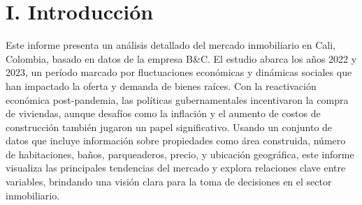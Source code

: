 \documentclass[conference,final,]{IEEEtran}
\begin{document}




\maketitle

\begin{abstract}

\end{abstract}





\maketitle


%
\IEEEpeerreviewmaketitle


\section{I. Introducción}

Este informe presenta un análisis detallado del mercado inmobiliario en
Cali, Colombia, basado en datos de la empresa B\&C. El estudio abarca
los años 2022 y 2023, un período marcado por fluctuaciones económicas y
dinámicas sociales que han impactado la oferta y demanda de bienes
raíces. Con la reactivación económica post-pandemia, las políticas
gubernamentales incentivaron la compra de viviendas, aunque desafíos
como la inflación y el aumento de costos de construcción también jugaron
un papel significativo. Usando un conjunto de datos que incluye
información sobre propiedades como área construida, número de
habitaciones, baños, parqueaderos, precio, y ubicación geográfica, este
informe visualiza las principales tendencias del mercado y explora
relaciones clave entre variables, brindando una visión clara para la
toma de decisiones en el sector inmobiliario.
\end{document}
